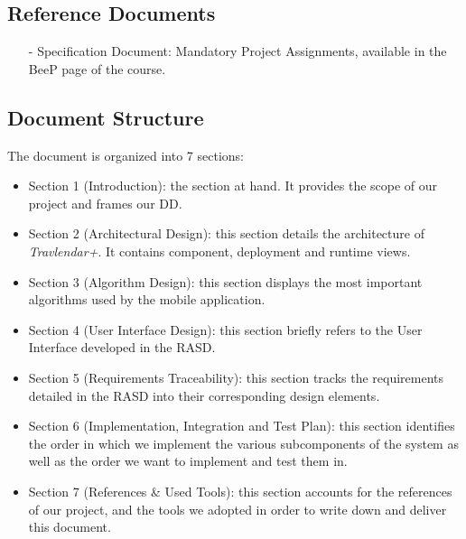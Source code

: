 \subsection{Reference Documents}
\begin{itemize}
		\item[-] \textsf{Specification Document: Mandatory Project Assignments}, available in the BeeP page of the course.
\end{itemize} 

\subsection{Document Structure}
The document is organized into 7 sections:

\begin{itemize}
	\item Section 1 (Introduction): the section at hand. It provides the scope of our project and frames our DD.
	\item Section 2 (Architectural Design): this section details the architecture of \textit{Travlendar+}. It contains component, deployment and runtime views.
	\item Section 3 (Algorithm Design): this section displays the most important algorithms used by the mobile application.
	\item Section 4 (User Interface Design): this section briefly refers to the User Interface developed in the RASD.
	\item Section 5 (Requirements Traceability): this section tracks the requirements detailed in the RASD into their corresponding design elements.
	\item Section 6 (Implementation, Integration and Test Plan): this section identifies the order in which we implement the various subcomponents of the system as well as the order we want to implement and test them in.
	\item Section 7 (References & Used Tools): this section accounts for the references of our project, and the tools we adopted in order to write down and deliver this document.
\end{itemize}

